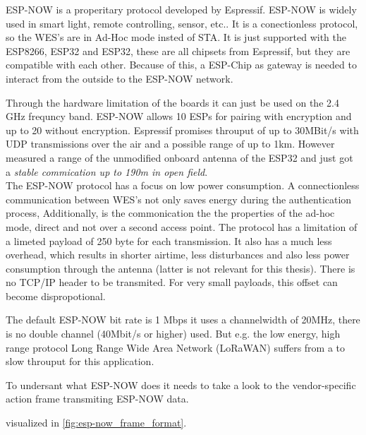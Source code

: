 \documentclass[]{ccs-thesis}
\begin{document}
ESP-NOW is a properitary protocol developed by Espressif. 
ESP-NOW is widely used in smart light, remote controlling, sensor, etc.. 
It is a conectionless protocol, so the \ac{WES}'s are in Ad-Hoc mode insted of \ac{STA}.
It is just supported with the ESP8266, ESP32 and ESP32, these are all chipsets from Espressif, but they are compatible with each other.
Because of this, a ESP-Chip as gateway is needed to interact from the outside to the ESP-NOW network. 

Through the hardware limitation of the boards it can just be used on the 2.4 GHz frequncy band.
ESP-NOW allows 10 ESPs for pairing with encryption and up to 20 without encryption.
Espressif promises throuput of up to 30MBit/s with UDP transmissions over the air and a possible range of up to 1km.
However \emph{\textcite{ESPNOWPaper}} measured a range of the unmodified onboard antenna of the ESP32 
and just got a \emph{\textcite{ESPNOWPaper} stable commication up to 190m in open field}.\\

The ESP-NOW protocol has a focus on low power consumption.
A connectionless communication between \ac{WES}'s not only saves energy during the authentication process, 
Additionally, is the commonication the the properties of the ad-hoc mode, direct and not over a second access point.
The protocol has a limitation of a limeted payload of 250 byte for each transmission.
It also has a much less overhead, which results in shorter airtime, less disturbances and also less power consumption through the antenna 
(latter is not relevant for this thesis).
There is no TCP/IP header to be transmited. 
For very small payloads, this offset can become dispropotional.

The default ESP-NOW bit rate is 1 Mbps it uses a channelwidth of 20MHz, there is no double channel (40Mbit/s or higher) used.
But e.g. the low energy, high range protocol Long Range Wide Area Network (LoRaWAN) suffers from a to slow throuput for this application.

To undersant what ESP-NOW does it needs to take a look to the vendor-specific action frame transmiting ESP-NOW data. 


visualized in \ref{fig:esp-now_frame_format}.
\end{document}
